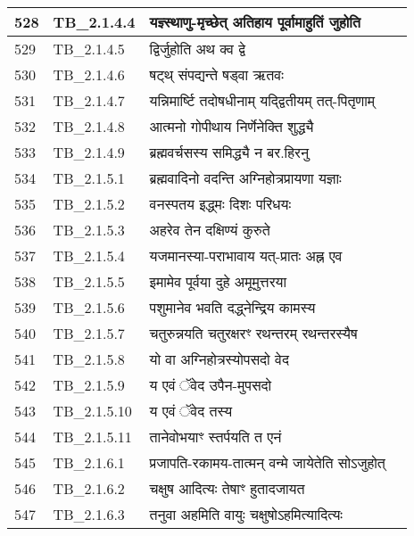 \documentclass[17pt]{extarticle}
\begin{document}
\begin{longtable}{||p{0.4in}||p{0.9in}||p{4.0in}||p{0.9in}||}
        \hline
            528 & TB\_2.1.4.4 & यज्ञ्स्थाणु{-}मृच्छेत् अतिहाय पूर्वामाहुतिं जुहोति &      \\
        \hline
            529 & TB\_2.1.4.5 & द्विर्जुहोति अथ क्व द्वे &      \\
        \hline
            530 & TB\_2.1.4.6 & षट्थ् संपद्यन्ते षड्वा ऋतवः &      \\
        \hline
            531 & TB\_2.1.4.7 & यन्निमार्ष्टि तदोषधीनाम् यद्द्वितीयम् तत्{-}पितृणाम् &      \\
        \hline
            532 & TB\_2.1.4.8 & आत्मनो गोपीथाय निर्णेनेक्ति शुद्ध्यै &      \\
        \hline
            533 & TB\_2.1.4.9 & ब्रह्मवर्चसस्य समिद्ध्यै न बर.हिरनु &      \\
        \hline
            534 & TB\_2.1.5.1 & ब्रह्मवादिनो वदन्ति अग्निहोत्रप्रायणा यज्ञाः &      \\
        \hline
            535 & TB\_2.1.5.2 & वनस्पतय इद्ध्मः दिशः परिधयः &      \\
        \hline
            536 & TB\_2.1.5.3 & अहरेव तेन दक्षिण्यं कुरुते &      \\
        \hline
            537 & TB\_2.1.5.4 & यजमानस्या{-}पराभावाय यत्{-}प्रातः अह्न एव &      \\
        \hline
            538 & TB\_2.1.5.5 & इमामेव पूर्वया दुहे अमूमुत्तरया &      \\
        \hline
            539 & TB\_2.1.5.6 & पशुमानेव भवति दद्ध्नेन्द्रिय कामस्य &      \\
        \hline
            540 & TB\_2.1.5.7 & चतुरुन्नयति चतुरक्षरꣳ रथन्तरम् रथन्तरस्यैष &      \\
        \hline
            541 & TB\_2.1.5.8 & यो वा अग्निहोत्रस्योपसदो वेद &      \\
        \hline
            542 & TB\_2.1.5.9 & य एवं ॅवेद उपैन{-}मुपसदो &      \\
        \hline
            543 & TB\_2.1.5.10 & य एवं ॅवेद तस्य &      \\
        \hline
            544 & TB\_2.1.5.11 & तानेवोभयाꣳ स्तर्पयति त एनं &      \\
        \hline
            545 & TB\_2.1.6.1 & प्रजापति{-}रकामय{-}तात्मन् वन्मे जायेतेति सोऽजुहोत् &      \\
        \hline
            546 & TB\_2.1.6.2 & चक्षुष आदित्यः तेषाꣳ हुतादजायत &      \\
        \hline
            547 & TB\_2.1.6.3 & तनुवा अहमिति वायुः चक्षुषोऽहमित्यादित्यः &      \\

\end{longtable}
\end{document}
